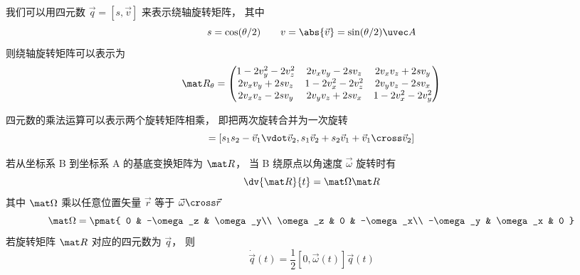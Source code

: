 

我们可以用四元数 $\vec q = [s, \vec v]$ 来表示绕轴旋转矩阵， 其中
\begin{equation}
s = \cos(\theta/2) \qquad v = \abs{\vec v} = \sin(\theta/2)\uvec A
\end{equation}
则绕轴旋转矩阵可以表示为
\begin{equation}
\mat R_\theta =
\begin{pmatrix}
1 - 2v_y^2 - 2v_z^2 & 2v_xv_y - 2sv_z  & 2v_x v_z + 2s v_y\\
2v_x v_y + 2sv_z & 1 - 2v_x^2 - 2v_z^2 & 2v_y v_z - 2s v_x\\
2v_x v_z - 2s v_y & 2v_y v_z + 2s v_x & 1 - 2v_x^2 - 2v_y^2
\end{pmatrix}
\end{equation}

四元数的乘法运算可以表示两个旋转矩阵相乘， 即把两次旋转合并为一次旋转
\begin{equation}
[s_1, \vec v_1] [s_2, \vec v_2] = [s_1 s_2 - \vec v_1 \vdot \vec v_2, s_1 \vec v_2 + s_2 \vec v_1 + \vec v_1 \cross \vec v_2]
\end{equation}

若从坐标系 B 到坐标系 A 的基底变换矩阵为 $\mat R$， 当 B 绕原点以角速度 $\vec \omega$ 旋转时有
\begin{equation}
\dv{\mat R}{t} = \mat \Omega \mat R
\end{equation}
其中 $\mat\Omega$ 乘以任意位置矢量 $\vec r$ 等于 $\vec \omega \cross \vec r$
\begin{equation}
\mat \Omega = \pmat{
0 & -\omega_z & \omega_y\\
\omega_z & 0 & -\omega_x\\
-\omega_y & \omega_x & 0
}\end{equation}
若旋转矩阵 $\mat R$ 对应的四元数为 $\vec q$， 则
\begin{equation}
\dot {\vec q}(t) = \frac12 [0, \vec \omega(t)] \vec q(t)
\end{equation}

